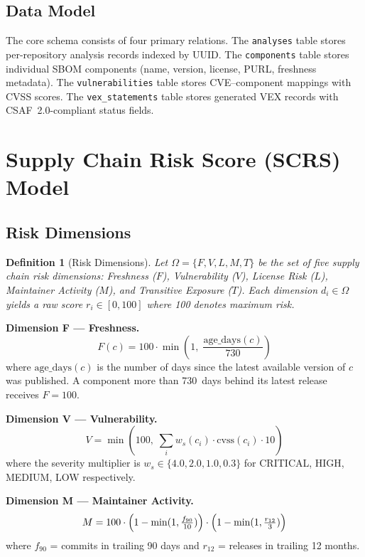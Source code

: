 \documentclass[11pt,twocolumn]{article}
\newtheorem{definition}{Definition}
\begin{document}
\subsection{Data Model}

The core schema consists of four primary relations. The \texttt{analyses} table
stores per-repository analysis records indexed by UUID. The \texttt{components}
table stores individual SBOM components (name, version, license, PURL, freshness
metadata). The \texttt{vulnerabilities} table stores CVE--component mappings with
CVSS scores. The \texttt{vex\_statements} table stores generated VEX records with
CSAF~2.0-compliant status fields.

\section{Supply Chain Risk Score (SCRS) Model}

\subsection{Risk Dimensions}

\begin{definition}[Risk Dimensions]
Let $\Omega = \{F, V, L, M, T\}$ be the set of five supply chain risk
dimensions: Freshness ($F$), Vulnerability ($V$), License Risk ($L$), Maintainer
Activity ($M$), and Transitive Exposure ($T$). Each dimension $d_i \in \Omega$
yields a raw score $r_i \in [0, 100]$ where 100 denotes maximum risk.
\end{definition}

\noindent\textbf{Dimension F --- Freshness.}
\begin{equation}
F(c) = 100 \cdot \min\!\left(1,\; \frac{\mathrm{age\_days}(c)}{730}\right)
\end{equation}
where $\mathrm{age\_days}(c)$ is the number of days since the latest available
version of $c$ was published. A component more than 730~days behind its latest
release receives $F = 100$.

\noindent\textbf{Dimension V --- Vulnerability.}
\begin{equation}
V = \min\!\left(100,\; \sum_i w_s(c_i) \cdot \mathrm{cvss}(c_i) \cdot 10\right)
\end{equation}
where the severity multiplier is
$w_s \in \{4.0, 2.0, 1.0, 0.3\}$ for CRITICAL, HIGH, MEDIUM, LOW respectively.

\noindent\textbf{Dimension M --- Maintainer Activity.}
\begin{equation}
M = 100 \cdot \Bigl(1 - \min(1, \tfrac{f_{90}}{10})\Bigr)
       \cdot \Bigl(1 - \min(1, \tfrac{r_{12}}{3})\Bigr)
\end{equation}
where $f_{90}$ = commits in trailing 90 days and $r_{12}$ = releases in trailing
12 months.
\end{document}
